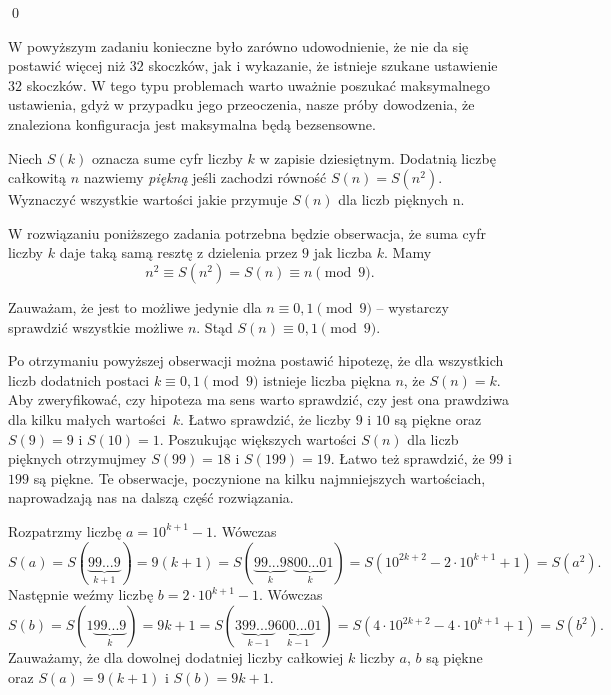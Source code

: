 \qed

\vspace{5px}

\noindent
W powyższym zadaniu konieczne było zarówno udowodnienie, że nie da się postawić więcej niż $32$ skoczków, jak i wykazanie, że istnieje szukane ustawienie $32$ skoczków. W tego typu problemach warto uważnie poszukać maksymalnego ustawienia, gdyż w przypadku jego przeoczenia, nasze próby dowodzenia, że znaleziona konfiguracja jest maksymalna będą bezsensowne. 

\vspace{10px}


\noindent
Niech $S(k)$ oznacza sume cyfr liczby $k$ w zapisie dziesiętnym. Dodatnią liczbę całkowitą $n$ nazwiemy \textit{piękną} jeśli zachodzi równość $S(n) = S(n^2)$. Wyznaczyć wszystkie wartości jakie przymuje $S(n)$ dla liczb pięknych n.

\newpage


\noindent
W rozwiązaniu poniższego zadania potrzebna będzie obserwacja, że suma cyfr liczby $k$ daje taką samą resztę z dzielenia przez $9$ jak liczba $k$. Mamy
\[
    n^2 \equiv S(n^2) = S(n) \equiv n \pmod{9}.
\]

\noindent
Zauważam, że jest to możliwe jedynie dla $n \equiv 0, 1 \pmod{9}$ -- wystarczy sprawdzić wszystkie możliwe $n$. Stąd $S(n) \equiv 0, 1 \pmod{9}$.

\vspace{5px}

\noindent
Po otrzymaniu powyższej obserwacji można postawić hipotezę, że dla wszystkich liczb dodatnich postaci $k \equiv 0, 1 \pmod{9}$ istnieje liczba piękna $n$, że $S(n) = k$. Aby zweryfikować, czy hipoteza ma sens warto sprawdzić, czy jest ona prawdziwa dla kilku małych wartości~$k$. Łatwo sprawdzić, że liczby $9$ i $10$ są piękne oraz $S(9) = 9$ i $S(10) = 1$. Poszukując większych wartości $S(n)$ dla liczb pięknych otrzymujmey $S(99) = 18$ i ${S(199) = 19}$. Łatwo też sprawdzić, że $99$ i $199$ są piękne. Te obserwacje, poczynione na kilku najmniejszych wartościach, naprowadzają nas na dalszą część rozwiązania.

\vspace{5px}

\noindent
Rozpatrzmy liczbę $a = 10^{k + 1} - 1$. Wówczas
\[
    S(a) = S(\underbrace{99...9}_{k+1}) = 9(k + 1) = S(\underbrace{99...9}_{k}8\underbrace{00...0}_{k}1) = S(10^{2k + 2} - 2\cdot 10^{k + 1} + 1) = S(a^2).
\]
Następnie weźmy liczbę $b = 2 \cdot 10^{k + 1} - 1$. Wówczas
\[
    S(b) = S(1\underbrace{99...9}_{k}) = 9k + 1 = S(3\underbrace{99...9}_{k-1}6\underbrace{00...0}_{k-1}1) = S(4\cdot 10^{2k + 2} - 4\cdot 10^{k + 1} + 1) = S(b^2).
\]
Zauważamy, że dla dowolnej dodatniej liczby całkowiej $k$ liczby $a$, $b$ są piękne oraz ${S(a) = 9(k + 1)}$ i $S(b) = 9k + 1$.

